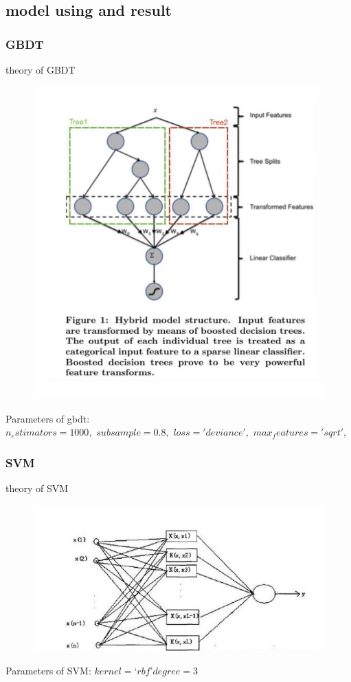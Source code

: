 \documentclass{article}
\begin{document}
\subsection{model using and result}
\subsubsection{GBDT}
theory of GBDT
 \begin{figure}[H]
\centering
  \includegraphics[width=.8\textwidth]{3-6.png} %
  \end{figure}
Parameters of gbdt:\\
    $n_estimators=1000,$
    $subsample=0.8,$
    $loss='deviance',$
    $max_features='sqrt',$

  \subsubsection{SVM}
 theory of SVM
  \begin{figure}[H]
\centering
  \includegraphics[width=.8\textwidth]{3-7.png} %
  \end{figure}
Parameters of SVM:
$
kernel=‘rbf’
degree=3
$
\end{document}
